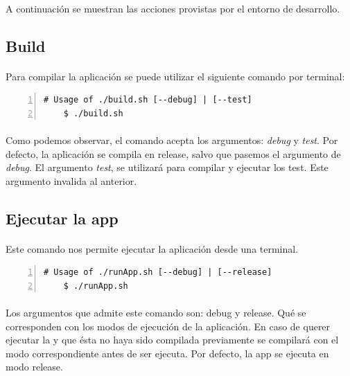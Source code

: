 \paragraph{}A continuación se muestran las acciones provistas por el entorno de desarrollo.

\subsection{Build}

\paragraph{}Para compilar la aplicación se puede utilizar el siguiente comando por
terminal:

\begin{lstlisting}[style=consola, numbers=left]
    # Usage of ./build.sh [--debug] | [--test]
    $ ./build.sh
\end{lstlisting}

\paragraph{}Como podemos observar, el comando acepta los argumentos: \emph{debug} y
\emph{test}. Por defecto, la aplicación se compila en \gls{release}, salvo que pasemos
el argumento de \emph{debug}. El argumento \emph{test}, se utilizará para compilar y
ejecutar los test. Este argumento invalida al anterior.

\subsection{Ejecutar la app}

\paragraph{}Este comando nos permite ejecutar la aplicación desde una terminal.

\begin{lstlisting}[style=consola, numbers=left]
    # Usage of ./runApp.sh [--debug] | [--release]
    $ ./runApp.sh
\end{lstlisting}

\paragraph{}Los argumentos que admite este comando son: \gls{debug} y \gls{release}.
Qué se corresponden con los modos de ejecución de la aplicación. En caso de querer
ejecutar la y que ésta no haya sido compilada previamente se compilará con el modo
correspondiente antes de ser ejecuta. Por defecto, la app se ejecuta en modo \gls{release}.

